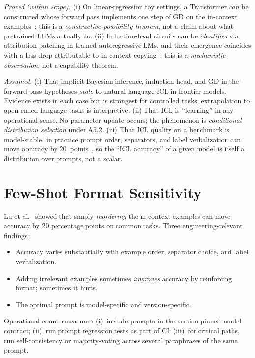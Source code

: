 \begin{provedassumed}
\emph{Proved (within scope).}
(i) On linear-regression toy settings, a Transformer \emph{can} be
constructed whose forward pass implements one step of GD on the
in-context examples~\citep{vonoswald2023transformers}; this is a
\emph{constructive possibility theorem}, not a claim about what
pretrained LLMs actually do.
(ii) Induction-head circuits can be \emph{identified} via
attribution patching in trained autoregressive LMs, and their
emergence coincides with a loss drop attributable to in-context
copying~\citep{olsson2022induction}; this is a \emph{mechanistic
observation}, not a capability theorem.

\emph{Assumed.}
(i) That implicit-Bayesian-inference, induction-head, and
GD-in-the-forward-pass hypotheses \emph{scale} to natural-language
ICL in frontier models. Evidence exists in each case but is
strongest for controlled tasks; extrapolation to open-ended language
tasks is interpretive.
(ii) That ICL is ``learning'' in any operational sense. No parameter
update occurs; the phenomenon is \emph{conditional distribution
selection} under A5.2.
(iii) That ICL quality on a benchmark is model-stable: in practice
prompt order, separators, and label verbalization can move accuracy
by 20~points~\citep{lu2022fantastically}, so the ``ICL accuracy'' of
a given model is itself a distribution over prompts, not a scalar.
\end{provedassumed}

\section{Few-Shot Format Sensitivity}

Lu et al.~\citep{lu2022fantastically} showed that simply
\emph{reordering} the in-context examples can move accuracy by 20
percentage points on common tasks. Three engineering-relevant
findings:
\begin{itemize}
  \item Accuracy varies substantially with example order, separator
        choice, and label verbalization.
  \item Adding irrelevant examples sometimes \emph{improves} accuracy
        by reinforcing format; sometimes it hurts.
  \item The optimal prompt is model-specific and version-specific.
\end{itemize}
Operational countermeasures:
(i)~include prompts in the version-pinned model contract;
(ii)~run prompt regression tests as part of CI;
(iii)~for critical paths, run self-consistency or majority-voting
across several paraphrases of the same prompt.

